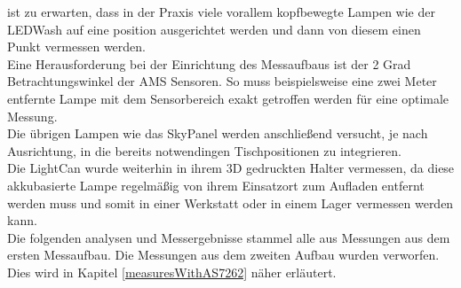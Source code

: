 \documentclass[11pt]{scrartcl}
\begin{document}
ist zu erwarten, dass in der Praxis viele vorallem kopfbewegte Lampen wie der LEDWash auf eine position ausgerichtet werden und dann von diesem
einen Punkt vermessen werden.\\
Eine Herausforderung bei der Einrichtung des Messaufbaus ist der 2 Grad Betrachtungswinkel der AMS Sensoren. So muss beispielsweise eine zwei
Meter entfernte Lampe mit dem Sensorbereich exakt getroffen werden für eine optimale Messung.\\
Die übrigen Lampen wie das SkyPanel werden anschließend versucht, je nach Ausrichtung, in die bereits notwendingen Tischpositionen zu integrieren.\\
Die LightCan wurde weiterhin in ihrem 3D gedruckten Halter vermessen, da diese akkubasierte Lampe regelmäßig von ihrem Einsatzort zum Aufladen
entfernt werden muss und somit in einer Werkstatt oder in einem Lager vermessen werden kann.\\
Die folgenden analysen und Messergebnisse stammel alle aus Messungen aus dem ersten Messaufbau. Die Messungen aus dem zweiten Aufbau wurden
verworfen. Dies wird in Kapitel \ref{measuresWithAS7262} näher erläutert.
\end{document}
